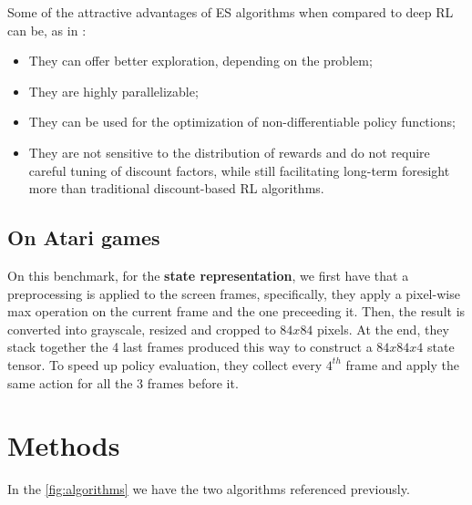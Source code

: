 \documentclass[10pt]{article} %
\begin{document}
Some of the attractive advantages of ES algorithms when compared to deep RL can be, as in \cite{DBLP:journals/corr/abs-1802-08842}:

\begin{itemize}
    \item They can offer better exploration, depending on the problem;
    \item They are highly parallelizable;
    \item They can be used for the optimization of non-differentiable policy functions;
    \item They are not sensitive to the distribution of rewards and do not require careful tuning of discount factors, while still facilitating long-term foresight more than traditional discount-based RL algorithms.
\end{itemize}

\subsection{On Atari games}

On this benchmark, for the \textbf{state representation}, we first have that a preprocessing is applied to the screen frames, specifically, they apply a pixel-wise max operation on the current frame and the one preceeding it. Then, the result is converted into grayscale, resized and cropped to $84x84$ pixels. At the end, they stack together the 4 last frames produced this way to construct a $84x84x4$ state tensor. To speed up policy evaluation, they collect every $4^{th}$ frame and apply the same action for all the $3$ frames before it.

\section{Methods}

In the \cref{fig:algorithms} we have the two algorithms referenced previously.

\end{document}
